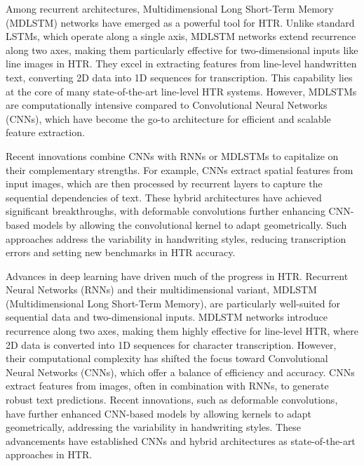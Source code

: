 \documentclass[conference]{IEEEtran}
\begin{document}
Among recurrent architectures, Multidimensional Long Short-Term Memory (MDLSTM) networks have emerged as a powerful tool for HTR. Unlike standard LSTMs, which operate along a single axis, MDLSTM networks extend recurrence along two axes, making them particularly effective for two-dimensional inputs like line images in HTR. They excel in extracting features from line-level handwritten text, converting 2D data into 1D sequences for transcription. This capability lies at the core of many state-of-the-art line-level HTR systems. However, MDLSTMs are computationally intensive compared to Convolutional Neural Networks (CNNs), which have become the go-to architecture for efficient and scalable feature extraction.

Recent innovations combine CNNs with RNNs or MDLSTMs to capitalize on their complementary strengths. For example, CNNs extract spatial features from input images, which are then processed by recurrent layers to capture the sequential dependencies of text. These hybrid architectures have achieved significant breakthroughs, with deformable convolutions further enhancing CNN-based models by allowing the convolutional kernel to adapt geometrically. Such approaches address the variability in handwriting styles, reducing transcription errors and setting new benchmarks in HTR accuracy.




Advances in deep learning have driven much of the progress in HTR. Recurrent Neural Networks (RNNs) and their multidimensional variant, MDLSTM (Multidimensional Long Short-Term Memory), are particularly well-suited for sequential data and two-dimensional inputs. MDLSTM networks introduce recurrence along two axes, making them highly effective for line-level HTR, where 2D data is converted into 1D sequences for character transcription. However, their computational complexity has shifted the focus toward Convolutional Neural Networks (CNNs), which offer a balance of efficiency and accuracy. CNNs extract features from images, often in combination with RNNs, to generate robust text predictions. Recent innovations, such as deformable convolutions, have further enhanced CNN-based models by allowing kernels to adapt geometrically, addressing the variability in handwriting styles. These advancements have established CNNs and hybrid architectures as state-of-the-art approaches in HTR.
\end{document}
